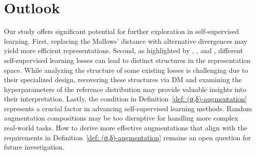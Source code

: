 \section{Outlook}
Our study offers significant potential for further exploration in self-supervised learning. First, replacing the Mallows' distance with alternative divergences may yield more efficient representations. Second, as highlighted by \citet{wang2020understanding}, \citet{Awasthi2022DoMN}, and \citet{duan2024unsupervisedtransferlearningadversarial}, different self-supervised learning losses can lead to distinct structures in the representation space. While analyzing the structure of some existing losses is challenging due to their specialized design, recovering these structures via DM and examining the hyperparameters of the reference distribution may provide valuable insights into their interpretation. Lastly, the condition in Definition~\ref{def: (σ,δ)-augmentation} represents a crucial factor in advancing self-supervised learning methods. Random augmentation compositions may be too disruptive for handling more complex real-world tasks. How to derive more effective augmentations that align with the requirements in Definition~\ref{def: (σ,δ)-augmentation} remains an open question for future investigation.